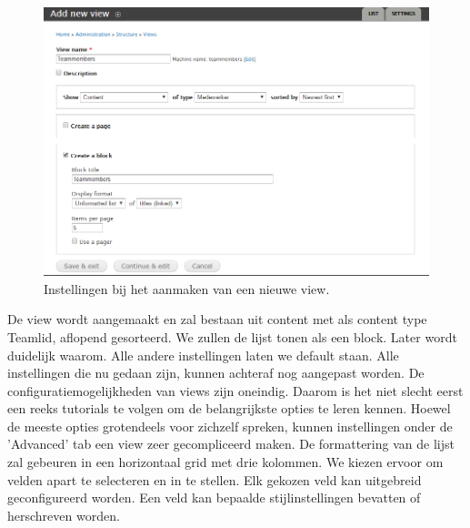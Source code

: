 \begin{figure}[!ht]
  \includegraphics[width=\textwidth]{img/dr-views-new.png}
  \centering
  \caption{Instellingen bij het aanmaken van een nieuwe view.}
  \label{fig:Drupal aanmaken View.}
\end{figure}

\pagebreak\noindent
De view wordt aangemaakt en zal bestaan uit content met als content type Teamlid, aflopend gesorteerd. We zullen de lijst tonen als een block. Later wordt duidelijk waarom. Alle andere instellingen laten we default staan. Alle instellingen die nu gedaan zijn, kunnen achteraf nog aangepast worden. De configuratiemogelijkheden van views zijn oneindig. Daarom is het niet slecht eerst een reeks tutorials te volgen om de belangrijkste opties te leren kennen. Hoewel de meeste opties grotendeels voor zichzelf spreken, kunnen instellingen onder de 'Advanced' tab een view zeer gecompliceerd maken.
\newline\newline
De formattering van de lijst zal gebeuren in een horizontaal grid met drie kolommen. We kiezen ervoor om velden apart te selecteren en in te stellen. Elk gekozen veld kan uitgebreid geconfigureerd worden. Een veld kan bepaalde stijlinstellingen bevatten of herschreven worden.

